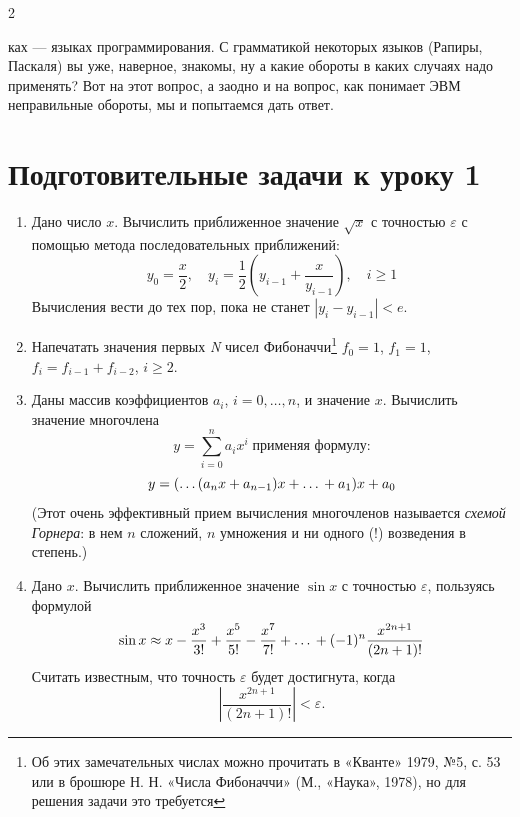 
\setcounter{page}{53}
\setlength{\parskip}{0em}
\setlength{\parindent}{2em}


\begin{multicols}{2} %

\noindent ках — языках программирования. С грамматикой некоторых языков (Рапиры, Паскаля) вы уже, наверное, знакомы, ну а какие обороты в каких случаях надо применять? Вот на этот вопрос, а заодно и на вопрос, как понимает ЭВМ неправильные обороты, мы и попытаемся дать ответ.

\section*{\normalsize Подготовительные задачи к уроку 1}

	\begin{enumerate}[label=\bfseries\arabic*., wide=0pt,itemindent = 2em]
		\item Дано число $x$. Вычислить приближенное значение $\sqrt{x}$ с точностью $\varepsilon$ с помощью метода последовательных приближений:
		\[
			y_0 = \frac{x}{2}, \quad y_i = \frac{1}{2} \left( y_{i-1} + \frac{x}{y_{i-1}} \right), \quad i \ge 1
		\]
		Вычисления вести до тех пор, пока не станет \linebreak$|y_i - y_{i-1}| < e$.
		
		\item Напечатать значения первых \textit{N} чисел Фибоначчи\footnote[1]{Об этих замечательных числах можно прочитать в «Кванте» 1979, №5, с. 53 или в брошюре Н. Н.  «Числа Фибоначчи» (М., «Наука», 1978), но для решения задачи это требуется}\linebreak  
		$f_0 = 1$, $f_1 = 1$, $f_i = f_{i-1} + f_{i-2}$, $i \ge 2$.
		
		\item Даны массив коэффициентов $a_i$, $i = 0, \dots, n$, и значение $x$. Вычислить значение многочлена
			\[
				y = \sum_{i=0}^{n} a_i x^i  \;\text{применяя формулу:}
			\]
			\[
				y = (\dots(a_n x + a_{n-1})x + \dots\vphantom  ++ a_1)x + a_0
			\]
		(Этот очень эффективный прием вычисления многочленов называется \textit{схемой Горнера}: в нем $n$ сложений, $n$ умножения и ни одного (!) возведения в степень.)
		
		\item Дано $x$. Вычислить приближенное значение $\sin x$ с точностью $\varepsilon$, пользуясь формулой  
			\[
				\sin x \approx x - \frac{x^3}{3!} + \frac{x^5}{5!} - \frac{x^7}{7!} + \dots\vphantom  ++ (-1)^n \frac{x^{2n+1}}{(2n+1)!}
			\]
		Считать известным, что точность $\varepsilon$ будет достигнута, когда  
			\[
				\left| \frac{x^{2n+1}}{(2n+1)!} \right| < \varepsilon.
			\]
		

\end{enumerate}
\end{multicols}
